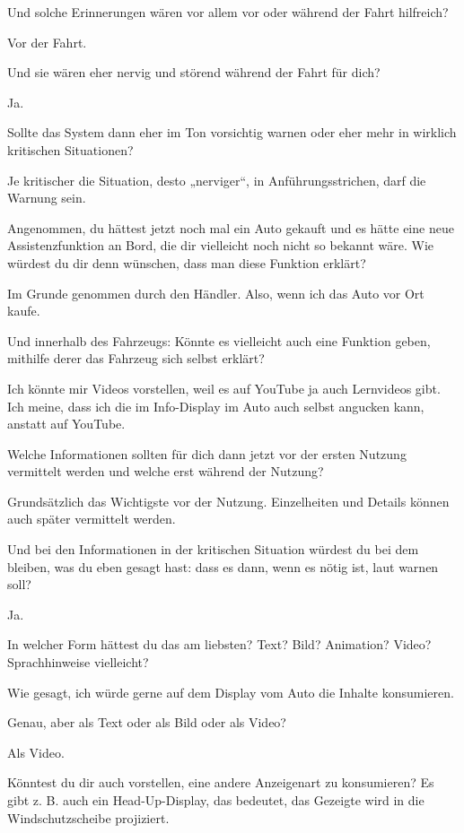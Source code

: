 \interviewerin
Und solche Erinnerungen wären vor allem vor oder während der Fahrt
hilfreich?

Vor der Fahrt.

\interviewerin
Und sie wären eher nervig und störend während der Fahrt für dich?

Ja.

\interviewerin
Sollte das System dann eher im Ton vorsichtig warnen oder eher mehr in
wirklich kritischen Situationen?

Je kritischer die Situation, desto „nerviger“, in Anführungsstrichen,
darf die Warnung sein.

\interviewerin
Angenommen, du hättest jetzt noch mal ein Auto gekauft und es hätte
eine neue Assistenzfunktion an Bord, die dir vielleicht noch nicht so
bekannt wäre. Wie würdest du dir denn wünschen, dass man diese Funktion
erklärt?

Im Grunde genommen durch den Händler. Also, wenn ich das Auto vor Ort
kaufe.

\interviewerin
Und innerhalb des Fahrzeugs: Könnte es vielleicht auch eine Funktion
geben, mithilfe derer das Fahrzeug sich selbst erklärt?

Ich könnte mir Videos vorstellen, weil es auf YouTube ja auch Lernvideos
gibt. Ich meine, dass ich die im Info-Display im Auto auch selbst
angucken kann, anstatt auf YouTube.

\interviewerin
Welche Informationen sollten für dich dann jetzt vor der ersten Nutzung
vermittelt werden und welche erst während der Nutzung?

Grundsätzlich das Wichtigste vor der Nutzung. Einzelheiten und Details
können auch später vermittelt werden.

\interviewerin
Und bei den Informationen in der kritischen Situation würdest du bei
dem bleiben, was du eben gesagt hast: dass es dann, wenn es nötig ist,
laut warnen soll?

Ja.

\interviewerin
In welcher Form hättest du das am liebsten? Text? Bild? Animation?
Video? Sprachhinweise vielleicht?

Wie gesagt, ich würde gerne auf dem Display vom Auto die Inhalte
konsumieren.

\interviewerin
Genau, aber als Text oder als Bild oder als Video?

Als Video.

\interviewerin
Könntest du dir auch vorstellen, eine andere Anzeigenart zu konsumieren?
Es gibt z. B. auch ein Head-Up-Display, das bedeutet, das Gezeigte wird
in die Windschutzscheibe projiziert.

